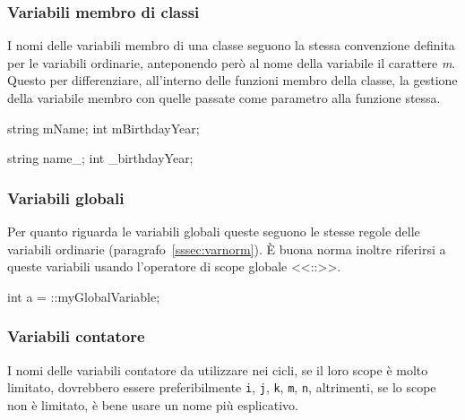 \subsubsection{Variabili membro di classi}

I nomi delle variabili membro di una classe seguono la stessa convenzione definita per le variabili ordinarie, anteponendo però al nome della variabile il carattere \emph{m}.
Questo per differenziare, all'interno delle funzioni membro della classe, la gestione della variabile membro con quelle passate come parametro alla funzione stessa.

\begin{minipage}[t]{\cbwidth}
\begin{RightCode}
string mName;
int mBirthdayYear;
\end{RightCode}
\end{minipage}%
\hspace{\cbdistance}
\begin{minipage}[t]{\cbwidth}
\begin{ErrorCode}
string name_;
int _birthdayYear;
\end{ErrorCode}
\end{minipage}

\subsubsection{Variabili globali}

Per quanto riguarda le variabili globali queste seguono le stesse regole delle variabili ordinarie (paragrafo~\ref{sssec:varnorm}).
È buona norma inoltre riferirsi a queste variabili usando l'operatore di scope globale <<::>>\cite{codestyle:geotechnical}.

\begin{minipage}[t]{\rbwidth}
\begin{RightCode}
int a = ::myGlobalVariable;
\end{RightCode}
\end{minipage}

\subsubsection{Variabili contatore}

I nomi delle variabili contatore da utilizzare nei cicli, se il loro scope è molto limitato, dovrebbero essere preferibilmente \texttt{i}, \texttt{j}, \texttt{k}, \texttt{m}, \texttt{n}, altrimenti, se lo scope non è limitato, è bene usare un nome più esplicativo.

